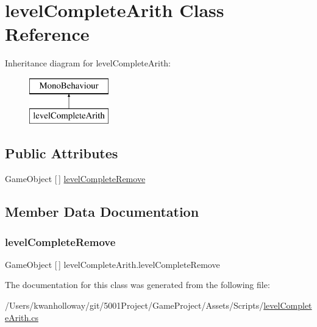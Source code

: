 \hypertarget{classlevel_complete_arith}{}\section{level\+Complete\+Arith Class Reference}
\label{classlevel_complete_arith}
Inheritance diagram for level\+Complete\+Arith\+:\begin{figure}[H]
\begin{center}
\leavevmode
\includegraphics[height=2.000000cm]{classlevel_complete_arith}
\end{center}
\end{figure}
\subsection*{Public Attributes}
\begin{DoxyCompactItemize}
\item 
Game\+Object \mbox{[}$\,$\mbox{]} \hyperlink{classlevel_complete_arith_a821ae9580d37b6d88ada1cf8d816cca5}{level\+Complete\+Remove}
\end{DoxyCompactItemize}


\subsection{Member Data Documentation}
\mbox{\label{classlevel_complete_arith_a821ae9580d37b6d88ada1cf8d816cca5}} 
\subsubsection{\texorpdfstring{level\+Complete\+Remove}{levelCompleteRemove}}
{\footnotesize\ttfamily Game\+Object \mbox{[}$\,$\mbox{]} level\+Complete\+Arith.\+level\+Complete\+Remove}



The documentation for this class was generated from the following file\+:\begin{DoxyCompactItemize}
\item 
/\+Users/kwanholloway/git/5001\+Project/\+Game\+Project/\+Assets/\+Scripts/\hyperlink{level_complete_arith_8cs}{level\+Complete\+Arith.\+cs}\end{DoxyCompactItemize}
